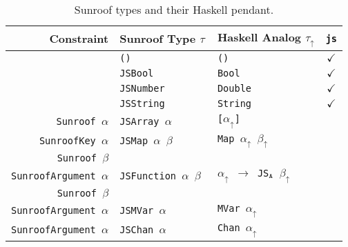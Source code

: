 \documentclass{llncs}
\newcommand{\HaskellAnalog}[1]{#1\ensuremath{_\uparrow}}
\newcommand{\Src}[1]{{\tt{#1}}}
\begin{document}
\begin{table}[t]
\begin{center}
\begin{tabular}{r@{\quad}l@{\quad}l@{\quad}c}
\hline\rule{0pt}{12pt}%
  Constraint
  & Sunroof Type $\tau$
  & Haskell Analog \HaskellAnalog{$\tau$}
  & \Src{js} \\ \hline\rule{0pt}{12pt}%
  
  & \Src{()}       & \Src{()}     & $\checkmark$ \\
  & \Src{JSBool}   & \Src{Bool}   & $\checkmark$ \\
  & \Src{JSNumber} & \Src{Double} & $\checkmark$ \\
  & \Src{JSString} & \Src{String} & $\checkmark$ \\
  
  \Src{Sunroof $\alpha$}
  & \Src{JSArray $\alpha$} 
  & \Src{[$\HaskellAnalog{\alpha}$]}
  & \\
  
  \Src{SunroofKey $\alpha$}
  & \Src{JSMap $\alpha$ $\beta$}
  & \Src{Map $\HaskellAnalog{\alpha}$ $\HaskellAnalog{\beta}$}
  & \\
  \Src{Sunroof $\beta$} \\
  
  \Src{SunroofArgument $\alpha$}
  & \Src{JSFunction $\alpha$ $\beta$ }
  & \Src{$\HaskellAnalog{\alpha}$ $\rightarrow$ JS$_\Src{A}$ $\HaskellAnalog{\beta}$} 
  & \\
  \Src{Sunroof $\beta$} \\
  
  \Src{SunroofArgument $\alpha$}
  & \Src{JSMVar $\alpha$}
  & \Src{MVar $\HaskellAnalog{\alpha}$}
  & \\
  
  \Src{SunroofArgument $\alpha$}
  & \Src{JSChan $\alpha$}
  & \Src{Chan $\HaskellAnalog{\alpha}$}
  & \\[2pt]
\hline
\end{tabular}
\end{center}
\caption{Sunroof types and their Haskell pendant.}
\label{tab:sunroof-types}
\end{table} 
\end{document}
